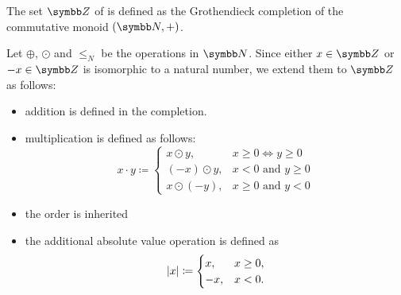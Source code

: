 \begin{definition}\label{def:integers}
  The set \( \Z \) of  is defined as the Grothendieck completion of the commutative monoid \( (\BB{N}, +) \).

  Let \( \oplus \), \( \odot \) and \( \leq_N \) be the operations in \( \BB{N} \). Since either \( x \in \Z \) or \( -x \in \Z \) is isomorphic to a natural number, we extend them to \( \Z \) as follows:
  \begin{itemize}
    \item addition is defined in the completion.
    \item multiplication is defined as follows:
    \begin{equation*}
      x \cdot y \coloneqq \begin{cases}
        x \odot y, & x \geq 0 \iff y \geq 0 \\
        (-x) \odot y, & x < 0 \text{ and } y \geq 0 \\
        x \odot (-y), & x \geq 0 \text{ and } y < 0
      \end{cases}
    \end{equation*}

    \item the order is inherited
    \item the additional absolute value operation is defined as
    \begin{equation*}
      \left\vert x \right\vert \coloneqq \begin{cases}
        x, &x \geq 0, \\
        -x, &x < 0.
      \end{cases}
    \end{equation*}
  \end{itemize}
\end{definition}
